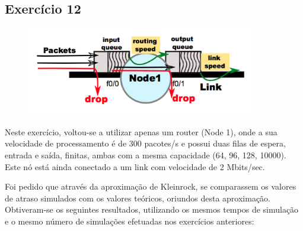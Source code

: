 \documentclass[pdftex,12pt,a4paper]{report}
\begin{document}
\newpage
\subsection{Exercício 12}
\begin{figure}[!htb]
\center
 \includegraphics[width=100mm,scale=1]{imagensGuia/ex12.png}
 \label{fig:ex12}
\end{figure}

Neste exercício, voltou-se a utilizar apenas um router (Node 1), onde a sua velocidade de processamento é de 300 pacotes/s e possui duas filas de espera, entrada e saída, finitas, ambas com a mesma capacidade (64, 96, 128, 10000). Este nó está ainda conectado a um link com velocidade de 2 Mbits/sec.

Foi pedido que através da aproximação de Kleinrock, se comparassem os valores de atraso simulados com os valores teóricos, oriundos desta aproximação. Obtiveram-se os seguintes resultados, utilizando os mesmos tempos de simulação e o mesmo número de simulações efetuadas nos exercícios anteriores:
\end{document}
